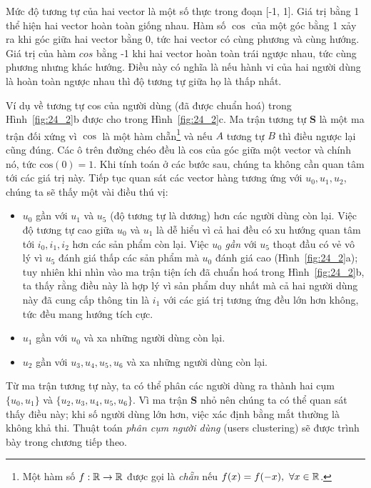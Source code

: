 Mức độ tương tự của hai vector là một số thực trong đoạn [-1, 1]. Giá
trị bằng 1 thể hiện hai vector hoàn toàn giống nhau. Hàm số
${\cos}$ của một góc bằng 1 xảy ra khi góc giữa hai vector bằng 0, tức hai
vector có cùng phương và cùng hướng. Giá trị của hàm ${cos}$ bằng -1 khi hai
vector hoàn toàn trái ngược nhau, tức cùng phương nhưng khác hướng. Điều này có
nghĩa là nếu {hành vi} của hai người dùng là hoàn toàn
ngược nhau thì độ tương tự giữa họ là thấp nhất.

Ví dụ về tương tự cos của người dùng (đã được chuẩn
hoá) trong Hình~\ref{fig:24_2}b được cho trong Hình~\ref{fig:24_2}c.
Ma trận tương tự $\mathbf{S}$ là
một ma trận đối xứng vì $\cos$ là một hàm chẵn\footnote{Một hàm số
$f:\mathbb{R}\rightarrow \mathbb{R}$ được gọi là \textit{chẵn} nếu $f(x) = f(-x),~\forall x \in
\mathbb{R}$.} và nếu $A$ tương tự $B$ thì điều
ngược lại cũng đúng. Các ô trên đường chéo đều là
$\text{cos}$ của góc giữa một vector và chính nó, tức $\text{cos}(0) = 1$. Khi
tính toán ở các bước sau, chúng ta không cần quan tâm tới các giá trị này.
Tiếp tục quan sát các vector hàng tương ứng với $u_0, u_1, u_2$, chúng ta sẽ
thấy một vài điều thú vị:

\begin{itemize}
\item $u_0$ {gần} với $u_1$ và $u_5$ (độ tương tự là dương) hơn các
người dùng còn lại. Việc độ tương tự cao giữa $u_0$ và $u_1$ là
dễ hiểu vì cả hai đều có xu hướng quan tâm tới $i_0, i_1, i_2$ hơn các
sản phẩm còn lại. Việc $u_0$ \textit{gần} với $u_5$ thoạt đầu có vẻ vô
lý vì $u_5$ đánh giá thấp các sản phẩm mà $u_0$ đánh giá cao
(Hình~\ref{fig:24_2}a); tuy nhiên khi nhìn vào ma trận tiện ích đã chuẩn hoá
trong Hình~\ref{fig:24_2}b, ta thấy rằng điều này là hợp lý vì sản phẩm duy
nhất mà cả hai người dùng này đã cung cấp thông tin là $i_1$ với các giá
trị tương ứng đều lớn hơn không, tức đều mang hướng tích cực.

\item $u_1$ gần với $u_0$ và xa những người dùng còn lại.

\item $u_2$ gần với $u_3, u_4, u_5, u_6$ và xa những người dùng còn lại.
\end{itemize}

Từ ma trận tương tự này, ta có thể phân các người dùng ra thành hai cụm $\{u_0,
u_1\}$ và $\{u_2, u_3, u_4, u_5, u_6\}$. Vì ma trận $\mathbf{S}$ nhỏ nên chúng ta
có thể quan sát thấy điều này; khi số người dùng lớn hơn, việc xác định bằng mắt
thường là không khả thi. Thuật toán \textit{phân cụm người dùng} ({users
clustering}) sẽ được trình bày trong chương tiếp theo.

